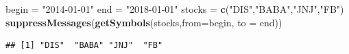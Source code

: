 \documentclass[]{article}
\newenvironment{Shaded}{\begin{snugshade}}{\end{snugshade}}
\newcommand{\KeywordTok}[1]{\textcolor[rgb]{0.13,0.29,0.53}{\textbf{#1}}}
\newcommand{\DataTypeTok}[1]{\textcolor[rgb]{0.13,0.29,0.53}{#1}}
\newcommand{\StringTok}[1]{\textcolor[rgb]{0.31,0.60,0.02}{#1}}
\newcommand{\NormalTok}[1]{#1}
\begin{document}
\begin{Shaded}
\begin{Highlighting}[]
\NormalTok{begin =}\StringTok{ "2014-01-01"}
\NormalTok{end =}\StringTok{ "2018-01-01"}
\NormalTok{stocks =}\StringTok{ }\KeywordTok{c}\NormalTok{(}\StringTok{"DIS"}\NormalTok{,}\StringTok{"BABA"}\NormalTok{,}\StringTok{"JNJ"}\NormalTok{,}\StringTok{"FB"}\NormalTok{)}
\KeywordTok{suppressMessages}\NormalTok{(}\KeywordTok{getSymbols}\NormalTok{(stocks,}\DataTypeTok{from=}\NormalTok{begin, }\DataTypeTok{to =}\NormalTok{ end))}
\end{Highlighting}
\end{Shaded}

\begin{verbatim}
## [1] "DIS"  "BABA" "JNJ"  "FB"
\end{verbatim}
\end{document}
